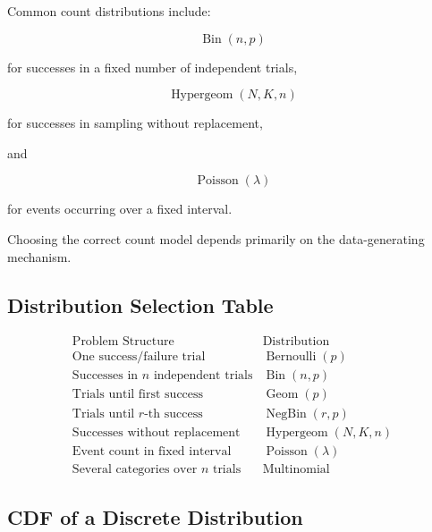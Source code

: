 Common count distributions include:

\[
\boxed{
\operatorname{Bin}(n,p)
}
\]

for successes in a fixed number of independent trials,

\[
\boxed{
\operatorname{Hypergeom}(N,K,n)
}
\]

for successes in sampling without replacement,

and

\[
\boxed{
\operatorname{Poisson}(\lambda)
}
\]

for events occurring over a fixed interval.

Choosing the correct count model depends primarily on the data-generating
mechanism.

\subsection{Distribution Selection Table}
\label{subsec:discrete-distribution-selection-table}

\[
\begin{array}{c|c}
\text{Problem Structure}
&
\text{Distribution}
\\
\hline
\text{One success/failure trial}
&
\operatorname{Bernoulli}(p)
\\[1mm]
\text{Successes in \(n\) independent trials}
&
\operatorname{Bin}(n,p)
\\[1mm]
\text{Trials until first success}
&
\operatorname{Geom}(p)
\\[1mm]
\text{Trials until \(r\)-th success}
&
\operatorname{NegBin}(r,p)
\\[1mm]
\text{Successes without replacement}
&
\operatorname{Hypergeom}(N,K,n)
\\[1mm]
\text{Event count in fixed interval}
&
\operatorname{Poisson}(\lambda)
\\[1mm]
\text{Several categories over \(n\) trials}
&
\operatorname{Multinomial}
\end{array}
\]

\subsection{CDF of a Discrete Distribution}
\label{subsec:discrete-distribution-cdf}

